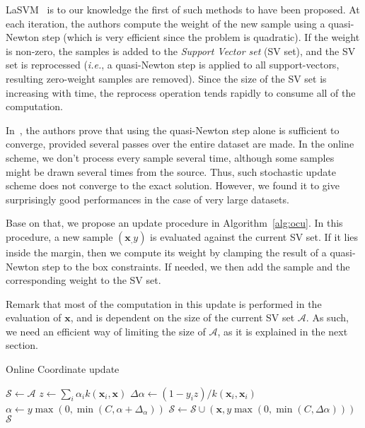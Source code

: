 \documentclass[10pt,final,a4paper]{article}
\newcommand{\x}{\mathbf{x}}
\newcommand{\Acal}{\mathcal{A}}
\newcommand{\Scal}{\mathcal{S}}
\begin{document}
LaSVM~\cite{bordes05jmlr} is to our knowledge the first of such methods to have been proposed.
At each iteration, the authors compute the weight of the new sample using a quasi-Newton step (which is very efficient since the problem is quadratic). If the weight is non-zero, the samples is added to the \emph{Support Vector set} (SV set), and the SV set is reprocessed (\textit{i.e.}, a quasi-Newton step is applied to all support-vectors, resulting zero-weight samples are removed).
Since the size of the SV set is increasing with time, the reprocess operation tends rapidly to consume all of the computation.

In~\cite{shalev13jmlr}, the authors prove that using the quasi-Newton step alone is sufficient to converge, provided several passes over the entire dataset are made.
In the online scheme, we don't process every sample several time, although some samples might be drawn several times from the source.
Thus, such stochastic update scheme does not converge to the exact solution. However, we found it to give surprisingly good performances in the case of very large datasets.

Base on that, we propose an update procedure in Algorithm~\ref{alg:ocu}.
In this procedure, a new sample $(\x_, y)$ is evaluated against the current SV set.
If it lies inside the margin, then we compute its weight by clamping the result of a quasi-Newton step to the box constraints.
If needed, we then add the sample and the corresponding weight to the SV set.

Remark that most of the computation in this update is performed in the evaluation of $\x$, and is dependent on the size of the current SV set $\Acal$.
As such, we need an efficient way of limiting the size of $\Acal$, as it is explained in the next section.

\begin{algorithm}[H]
\caption{Online Coordinate update}
\label{alg:ocu}
\begin{algorithmic}
\Function{update}{$\Acal = \{ (\x_i, y_i)$ ,$\x$, $y$}
\State $\Scal \leftarrow \Acal$
\State $z \leftarrow \sum_i \alpha_i k(\x_i, \x)$
\State $\Delta\alpha \leftarrow (1 - y_i z)/k(\x_i, \x_i)$
\If{$(\x, \alpha) \in \Scal$}
\State $\alpha \leftarrow y\max(0, \min(C, \alpha+\Delta_\alpha))$
\Else
\State $\Scal \leftarrow \Scal \cup (\x, y\max(0, \min(C, \Delta\alpha))) $
\EndIf
\EndIf
\State \Return $\Scal$
\EndFunction
\end{algorithmic}
\end{algorithm}
\end{document}
